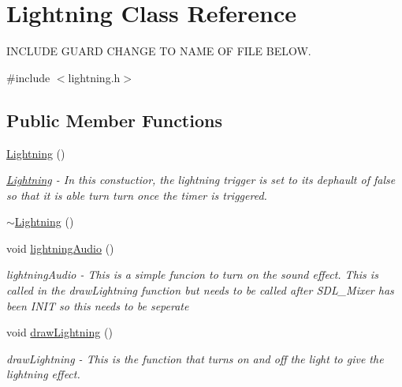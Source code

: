 \hypertarget{classLightning}{
\section{Lightning Class Reference}
\label{classLightning}
}


INCLUDE GUARD CHANGE TO NAME OF FILE BELOW.  


{\ttfamily \#include $<$lightning.h$>$}\subsection*{Public Member Functions}
\begin{DoxyCompactItemize}
\item 
\hypertarget{classLightning_a08ffa8f69fd5d5ed8c144717e5714d29}{
\hyperlink{classLightning_a08ffa8f69fd5d5ed8c144717e5714d29}{Lightning} ()}
\label{classLightning_a08ffa8f69fd5d5ed8c144717e5714d29}

\begin{DoxyCompactList}\small\item\em \hyperlink{classLightning}{Lightning} -\/ In this constuctior, the lightning trigger is set to its dephault of false so that it is able turn turn once the timer is triggered. \item\end{DoxyCompactList}\item 
\hyperlink{classLightning_aa42fc3f22b3f0234067b92dee0daa46f}{$\sim$Lightning} ()
\item 
\hypertarget{classLightning_a4955ae00003d7f74f1f05b840272f5af}{
void \hyperlink{classLightning_a4955ae00003d7f74f1f05b840272f5af}{lightningAudio} ()}
\label{classLightning_a4955ae00003d7f74f1f05b840272f5af}

\begin{DoxyCompactList}\small\item\em lightningAudio -\/ This is a simple funcion to turn on the sound effect. This is called in the drawLightning function but needs to be called after SDL\_\-Mixer has been INIT so this needs to be seperate \item\end{DoxyCompactList}\item 
\hypertarget{classLightning_aeb864ad6e8d431dc0778676dfe7eab20}{
void \hyperlink{classLightning_aeb864ad6e8d431dc0778676dfe7eab20}{drawLightning} ()}
\label{classLightning_aeb864ad6e8d431dc0778676dfe7eab20}

\begin{DoxyCompactList}\small\item\em drawLightning -\/ This is the function that turns on and off the light to give the lightning effect. \item\end{DoxyCompactList}\end{DoxyCompactItemize}
